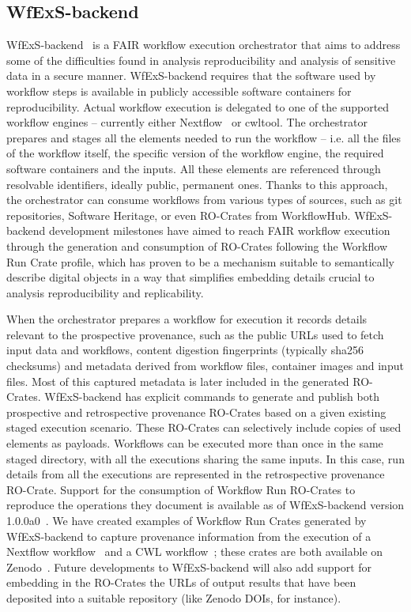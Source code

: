 \documentclass[10pt,letterpaper]{article}
\begin{document}
\subsection{WfExS-backend}\label{wfexs}

WfExS-backend~\cite{Fernandez 2024a} is a FAIR workflow execution orchestrator that aims to address some of the difficulties found in analysis reproducibility and analysis of sensitive data in a secure manner.
WfExS-backend requires that the software used by workflow steps is available in publicly accessible software containers for reproducibility.
Actual workflow execution is delegated to one of the supported workflow engines -- currently either Nextflow~\cite{Di Tommaso 2017} or cwltool.
The orchestrator prepares and stages all the elements needed to run the workflow -- i.e. all the files of the workflow itself, the specific version of the workflow engine, the required software containers and the inputs.
All these elements are referenced through resolvable identifiers, ideally public, permanent ones.
Thanks to this approach, the orchestrator can consume workflows from various types of sources, such as git repositories, Software Heritage, or even RO-Crates from WorkflowHub.
%
WfExS-backend development milestones have aimed to reach FAIR workflow execution through the generation and consumption of RO-Crates following the Workflow Run Crate profile, which has proven to be a mechanism suitable to semantically describe digital objects in a way that simplifies embedding details crucial to analysis reproducibility and replicability.

When the orchestrator prepares a workflow for execution it records details relevant to the prospective provenance, such as the public URLs used to fetch input data and workflows, content digestion fingerprints (typically sha256 checksums) and metadata derived from workflow files, container images and input files.
Most of this captured metadata is later included in the generated RO-Crates. WfExS-backend has explicit commands to generate and publish both prospective and retrospective provenance RO-Crates based on a given existing staged execution scenario.
These RO-Crates can selectively include copies of used elements as payloads.
Workflows can be executed more than once in the same staged directory, with all the executions sharing the same inputs.
In this case, run details from all the executions are represented in the retrospective provenance RO-Crate. Support for the consumption of Workflow Run RO-Crates to reproduce the operations they document is available as of WfExS-backend version 1.0.0a0~\cite{Fernandez 2024a}.
%
We have created examples of Workflow Run Crates generated by WfExS-backend to capture provenance information from the execution of a Nextflow workflow~\cite{Bouyssie 2023} and a CWL workflow~\cite{Amstutz 2023}; these crates are both available on Zenodo~\cite{Fernandez 2024b, Fernandez 2024c}.
%
Future developments to WfExS-backend will also add support for embedding in the RO-Crates the URLs of output results that have been deposited into a suitable repository (like Zenodo DOIs, for instance).
\end{document}

